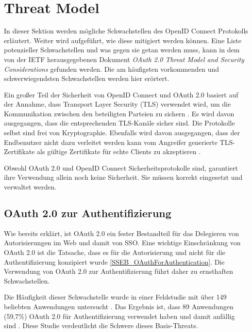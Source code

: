 \section{Threat Model} \label{SSEB_Threat Model}

In dieser Sektion werden mögliche Schwachstellen des OpenID Connect Protokolls erläutert. Weiter wird aufgeführt, wie diese mitigiert werden können. Eine Liste potenzieller Schwachstellen und was gegen sie getan werden muss, kann in dem von der IETF herausgegebenen Dokument \textit{OAuth 2.0 Threat Model and Security Considerations} \cite{SSEB_RFC6819} gefunden werden. Die am häufigsten vorkommenden und schwerwiegendsten Schwachstellen werden hier erörtert. \cite{SSEB_ssoProtocols}

Ein großer Teil der Sicherheit von OpenID Connect und OAuth 2.0 basiert auf der Annahme, dass Transport Layer Security (TLS) verwendet wird, um die Kommunikation zwischen den beteiligten Parteien zu sichern \cite{SSEB_mladenov2016security}. Es wird davon ausgegangen, dass die entsprechenden TLS-Kanäle sicher sind. Die Protokolle selbst sind frei von Kryptographie. Ebenfalls wird davon ausgegangen, dass der Endbenutzer nicht dazu verleitet werden kann vom Angreifer generierte TLS-Zertifikate als gültige Zertifikate für echte Clients zu akzeptieren \cite{SSEB_mladenov2016security}.

Obwohl OAuth 2.0 und OpenID Connect Sicherheitsprotokolle sind, garantiert ihre Verwendung allein noch keine Sicherheit. Sie müssen korrekt eingesetzt und verwaltet werden.

\subsection{OAuth 2.0 zur Authentifizierung}

Wie bereits erklärt, ist OAuth 2.0 ein fester Bestandteil für das Delegieren von Autorisierungen im Web und damit von SSO. Eine wichtige Einschränkung von OAuth 2.0 ist die Tatsache, dass es für die Autorisierung und nicht für die Authentifizierung konzipiert wurde \ref{SSEB_OAuthForAuthentication}. Die Verwendung von OAuth 2.0 zur Authentifizierung führt daher zu ernsthaften Schwachstellen.

Die Häufigkeit dieser Schwachstelle wurde in einer Feldstudie mit über 149 beliebten Anwendungen untersucht \cite{SSEB_chen2014oauth}. Das Ergebnis ist, dass 89 Anwendungen (59,7\%) OAuth 2.0 für Authentifizierung verwendet haben und damit anfällig sind \cite{SSEB_chen2014oauth}. Diese Studie verdeutlicht die Schwere dieses Basis-Threats.

